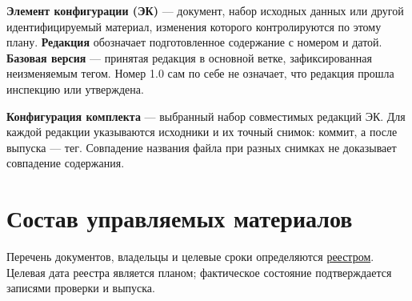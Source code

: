 \documentclass[12pt,a4paper]{article}
\begin{document}
\textbf{Элемент конфигурации (ЭК)} --- документ, набор исходных данных или другой идентифицируемый материал, изменения которого контролируются по этому плану. \textbf{Редакция} обозначает подготовленное содержание с номером и датой. \textbf{Базовая версия} --- принятая редакция в основной ветке, зафиксированная неизменяемым тегом. Номер 1.0 сам по себе не означает, что редакция прошла инспекцию или утверждена.

\textbf{Конфигурация комплекта} --- выбранный набор совместимых редакций ЭК. Для каждой редакции указываются исходники и их точный снимок: коммит, а после выпуска --- тег. Совпадение названия файла при разных снимках не доказывает совпадение содержания.

\section{Состав управляемых материалов}\label{2-ux441ux43eux441ux442ux430ux432-ux443ux43fux440ux430ux432ux43bux44fux435ux43cux44bux445-ux43cux430ux442ux435ux440ux438ux430ux43bux43eux432}

\hypertarget{2-состав-управляемых-материалов}{}

Перечень документов, владельцы и целевые сроки определяются \href{https://github.com/Kokorev-VD/mephi-samolety/blob/main/base/\%D0\%A0\%D0\%B5\%D0\%B5\%D1\%81\%D1\%82\%D1\%80_\%D0\%B4\%D0\%BE\%D0\%BA\%D1\%83\%D0\%BC\%D0\%B5\%D0\%BD\%D1\%82\%D0\%BE\%D0\%B2.md}{реестром}. Целевая дата реестра является планом; фактическое состояние подтверждается записями проверки и выпуска.
\end{document}
